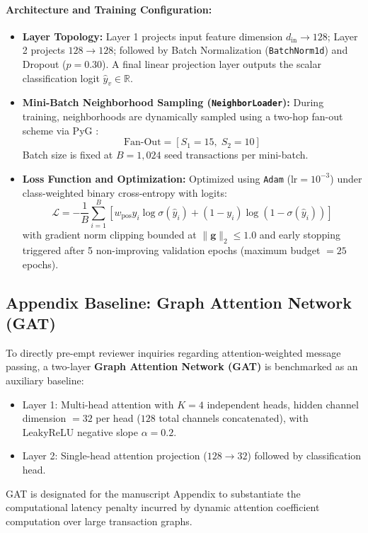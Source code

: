 \documentclass[11pt,a4paper]{article}
\begin{document}
\paragraph{Architecture and Training Configuration:}
\begin{itemize}[leftmargin=*]
    \item \textbf{Layer Topology:} Layer 1 projects input feature dimension $d_{\text{in}} \to 128$; Layer 2 projects $128 \to 128$; followed by Batch Normalization (\texttt{BatchNorm1d}) and Dropout ($p = 0.30$). A final linear projection layer outputs the scalar classification logit $\hat{y}_v \in \mathbb{R}$.
    \item \textbf{Mini-Batch Neighborhood Sampling (\texttt{NeighborLoader}):} During training, neighborhoods are dynamically sampled using a two-hop fan-out scheme via PyG \cite{fey2019fast}:
    \begin{equation}
    \text{Fan-Out} = [S_1 = 15, \; S_2 = 10]
    \end{equation}
    Batch size is fixed at $B = 1,024$ seed transactions per mini-batch.
    \item \textbf{Loss Function and Optimization:} Optimized using \texttt{Adam} ($\text{lr} = 10^{-3}$) under class-weighted binary cross-entropy with logits:
    \begin{equation}
    \mathcal{L} = -\frac{1}{B} \sum_{i=1}^B \left[ w_{\text{pos}} y_i \log \sigma(\hat{y}_i) + (1 - y_i) \log (1 - \sigma(\hat{y}_i)) \right]
    \end{equation}
    with gradient norm clipping bounded at $\|\mathbf{g}\|_2 \le 1.0$ and early stopping triggered after 5 non-improving validation epochs (maximum budget $= 25$ epochs).
\end{itemize}

\subsection{Appendix Baseline: Graph Attention Network (GAT)}
To directly pre-empt reviewer inquiries regarding attention-weighted message passing, a two-layer \textbf{Graph Attention Network (GAT)} \cite{velickovic2018graph} is benchmarked as an auxiliary baseline:
\begin{itemize}[leftmargin=*]
    \item Layer 1: Multi-head attention with $K=4$ independent heads, hidden channel dimension $= 32$ per head ($128$ total channels concatenated), with LeakyReLU negative slope $\alpha = 0.2$.
    \item Layer 2: Single-head attention projection ($128 \to 32$) followed by classification head.
\end{itemize}
GAT is designated for the manuscript Appendix to substantiate the computational latency penalty incurred by dynamic attention coefficient computation over large transaction graphs.
\end{document}
